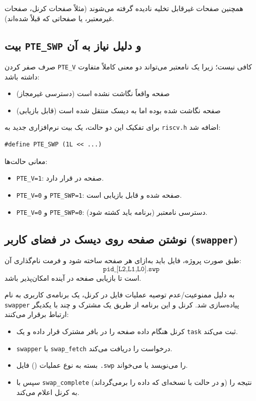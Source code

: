 \documentclass[12pt]{article}
\begin{document}
همچنین صفحات غیرقابل تخلیه نادیده گرفته می‌شوند (مثلاً صفحات کرنل، صفحات غیرمعتبر، یا صفحاتی که قبلاً  شده‌اند).

\subsection{بیت \texttt{PTE\_SWP} و دلیل نیاز به آن}
صرف صفر کردن \texttt{PTE\_V} کافی نیست؛ زیرا یک  نامعتبر می‌تواند دو معنی کاملاً متفاوت داشته باشد:
\begin{itemize}
  \item صفحه واقعاً نگاشت نشده است (دسترسی غیرمجاز)
  \item صفحه نگاشت شده بوده اما به دیسک منتقل شده است (قابل بازیابی)
\end{itemize}

برای تفکیک این دو حالت، یک بیت نرم‌افزاری جدید به \texttt{riscv.h} اضافه شد:
\begin{LTR}
\begin{lstlisting}
#define PTE_SWP (1L << ...)
\end{lstlisting}
\end{LTR}

معانی حالت‌ها:
\begin{itemize}
  \item \texttt{PTE\_V=1}: صفحه در  قرار دارد.
  \item \texttt{PTE\_V=0} و \texttt{PTE\_SWP=1}: صفحه  شده و قابل بازیابی است.
  \item \texttt{PTE\_V=0} و \texttt{PTE\_SWP=0}: دسترسی نامعتبر (برنامه باید کشته شود).
\end{itemize}

\subsection{نوشتن صفحه روی دیسک در فضای کاربر (\texttt{swapper})}
طبق صورت پروژه، فایل  باید به‌ازای هر صفحه ساخته شود و فرمت نام‌گذاری آن:
\[
\texttt{pid\_[L2,L1,L0].swp}
\]
است تا بازیابی صفحه در آینده امکان‌پذیر باشد.

به دلیل ممنوعیت/عدم توصیه عملیات فایل در کرنل، یک برنامه‌ی کاربری به نام \texttt{swapper} پیاده‌سازی شد. کرنل و این برنامه از طریق یک  مشترک و چند  با یکدیگر ارتباط برقرار می‌کنند:
\begin{itemize}
  \item کرنل هنگام  داده صفحه را در بافر مشترک قرار داده و یک \texttt{task} ثبت می‌کند.
  \item \texttt{swapper} با \texttt{swap\_fetch} درخواست را دریافت می‌کند.
  \item بسته به نوع عملیات () فایل \texttt{.swp} را می‌نویسد یا می‌خواند.
  \item سپس با \texttt{swap\_complete} (و در حالت  با نسخه‌ای که داده را برمی‌گرداند) نتیجه را به کرنل اعلام می‌کند.
\end{itemize}
\end{document}
